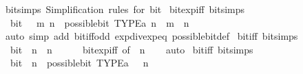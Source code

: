 \begin{isabellebody}
\endisatagproof
{\isafoldproof}%
%
\isadelimproof
\isanewline
%
\endisadelimproof
\isanewline
{}\isamarkupfalse%
\ bit{\isacharunderscore}{\kern0pt}simps\ {\isacartoucheopen}Simplification\ rules\ for\ \isactrlconst {\isasymopen}bit{\isasymclose}{\isacartoucheclose}\isanewline
\isanewline
{}\isamarkupfalse%
\ bit{\isacharunderscore}{\kern0pt}exp{\isacharunderscore}{\kern0pt}iff\ {\isacharbrackleft}{\kern0pt}bit{\isacharunderscore}{\kern0pt}simps{\isacharbrackright}{\kern0pt}{\isacharcolon}{\kern0pt}\isanewline
\ \ {\isacartoucheopen}bit\ {\isacharparenleft}{\kern0pt}{}\ {\isacharcircum}{\kern0pt}\ m{\isacharparenright}{\kern0pt}\ n\ {\isasymlongleftrightarrow}\ possible{\isacharunderscore}{\kern0pt}bit\ TYPE{\isacharparenleft}{\kern0pt}{\isacharprime}{\kern0pt}a{\isacharparenright}{\kern0pt}\ n\ {\isasymand}\ m\ {\isacharequal}{\kern0pt}\ n{\isacartoucheclose}\isanewline
%
\isadelimproof
\ \ %
\endisadelimproof
%
\isatagproof
{}\isamarkupfalse%
\ {\isacharparenleft}{\kern0pt}auto\ simp\ add{\isacharcolon}{\kern0pt}\ bit{\isacharunderscore}{\kern0pt}iff{\isacharunderscore}{\kern0pt}odd\ exp{\isacharunderscore}{\kern0pt}div{\isacharunderscore}{\kern0pt}exp{\isacharunderscore}{\kern0pt}eq\ possible{\isacharunderscore}{\kern0pt}bit{\isacharunderscore}{\kern0pt}def{\isacharparenright}{\kern0pt}%
\endisatagproof
{\isafoldproof}%
%
\isadelimproof
\isanewline
%
\endisadelimproof
\isanewline
{}\isamarkupfalse%
\ bit{\isacharunderscore}{\kern0pt}{}{\isacharunderscore}{\kern0pt}iff\ {\isacharbrackleft}{\kern0pt}bit{\isacharunderscore}{\kern0pt}simps{\isacharbrackright}{\kern0pt}{\isacharcolon}{\kern0pt}\isanewline
\ \ {\isacartoucheopen}bit\ {}\ n\ {\isasymlongleftrightarrow}\ n\ {\isacharequal}{\kern0pt}\ {}{\isacartoucheclose}\isanewline
%
\isadelimproof
\ \ %
\endisadelimproof
%
\isatagproof
{}\isamarkupfalse%
\ bit{\isacharunderscore}{\kern0pt}exp{\isacharunderscore}{\kern0pt}iff\ {\isacharbrackleft}{\kern0pt}of\ {}\ n{\isacharbrackright}{\kern0pt}\isanewline
\ \ \isamarkupfalse%
\ auto%
\endisatagproof
{\isafoldproof}%
%
\isadelimproof
\isanewline
%
\endisadelimproof
\isanewline
{}\isamarkupfalse%
\ bit{\isacharunderscore}{\kern0pt}{}{\isacharunderscore}{\kern0pt}iff\ {\isacharbrackleft}{\kern0pt}bit{\isacharunderscore}{\kern0pt}simps{\isacharbrackright}{\kern0pt}{\isacharcolon}{\kern0pt}\isanewline
\ \ {\isacartoucheopen}bit\ {}\ n\ {\isasymlongleftrightarrow}\ possible{\isacharunderscore}{\kern0pt}bit\ TYPE{\isacharparenleft}{\kern0pt}{\isacharprime}{\kern0pt}a{\isacharparenright}{\kern0pt}\ {}\ {\isasymand}\ n\ {\isacharequal}{\kern0pt}\ {}{\isacartoucheclose}\isanewline

\end{isabellebody}
